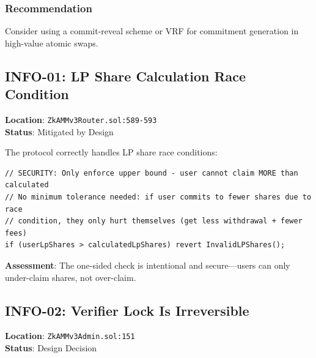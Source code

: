 \documentclass[12pt,a4paper]{article}
\begin{document}
\subsubsection{Recommendation}

Consider using a commit-reveal scheme or VRF for commitment generation in high-value atomic swaps.

\subsection{INFO-01: LP Share Calculation Race Condition}

\begin{tcolorbox}[colback=blue!10, colframe=blue!80!black, title=Informational]
\textbf{Location}: \texttt{ZkAMMv3Router.sol:589-593}\\
\textbf{Status}: Mitigated by Design
\end{tcolorbox}

The protocol correctly handles LP share race conditions:

\begin{lstlisting}[language=Solidity]
// SECURITY: Only enforce upper bound - user cannot claim MORE than calculated
// No minimum tolerance needed: if user commits to fewer shares due to race
// condition, they only hurt themselves (get less withdrawal + fewer fees)
if (userLpShares > calculatedLpShares) revert InvalidLPShares();
\end{lstlisting}

\textbf{Assessment}: The one-sided check is intentional and secure---users can only under-claim shares, not over-claim.

\subsection{INFO-02: Verifier Lock Is Irreversible}

\begin{tcolorbox}[colback=blue!10, colframe=blue!80!black, title=Informational]
\textbf{Location}: \texttt{ZkAMMv3Admin.sol:151}\\
\textbf{Status}: Design Decision
\end{tcolorbox}
\end{document}
